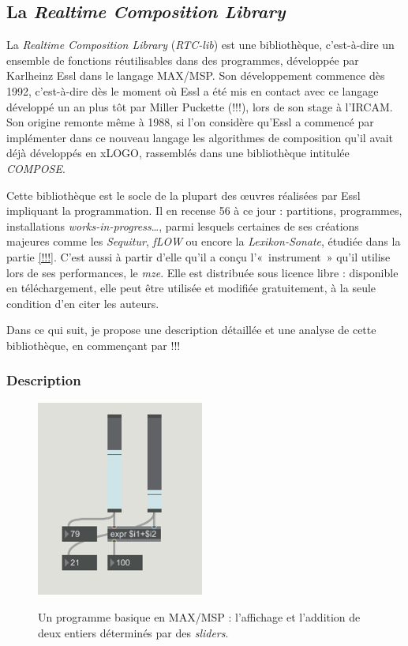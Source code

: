\documentclass[a4paper,12pt]{article}
\newcommand{\guill}[1]{«~#1~»}
\newcommand{\maze}[0]{\emph{m\symbol{64}ze\textdegree2}}
\begin{document}
\subsection{La \emph{Realtime Composition Library}}

La \emph{Realtime Composition Library} (\emph{RTC-lib}) est une bibliothèque, c'est-à-dire un ensemble de fonctions réutilisables dans des programmes, développée par Karlheinz Essl dans le langage MAX/MSP. Son développement commence dès 1992, c'est-à-dire dès le moment où Essl a été mis en contact avec ce langage développé un an plus tôt par Miller Puckette (!!!), lors de son stage à l'IRCAM. Son origine remonte même à 1988, si l'on considère qu'Essl a commencé par implémenter dans ce nouveau langage les algorithmes de composition qu'il avait déjà développés en xLOGO, rassemblés dans une bibliothèque intitulée \emph{COMPOSE}.

Cette bibliothèque est le socle de la plupart des œuvres réalisées par Essl impliquant la programmation. Il en recense 56 à ce jour : partitions, programmes, installations \emph{works-in-progress}\dots, parmi lesquels certaines de ses créations majeures comme les \emph{Sequitur}, \emph{fLOW} ou encore la \emph{Lexikon-Sonate}, étudiée dans la partie \ref{!!!}. C'est aussi à partir d'elle qu'il a conçu l'\guill{instrument} qu'il utilise lors de ses performances, le \maze. Elle est distribuée sous licence libre : disponible en téléchargement, elle peut être utilisée et modifiée gratuitement, à la seule condition d'en citer les auteurs.

Dans ce qui suit, je propose une description détaillée et une analyse de cette bibliothèque, en commençant par !!!

\subsubsection{Description}

\begin{figure}[h!]
\centering
\includegraphics[width=5.5cm]{images/MAXbase.png}
\label{maxmsp}
\caption{Un programme basique en MAX/MSP : l'affichage et l'addition de deux entiers déterminés par des \emph{sliders}.}
\end{figure}
\end{document}
